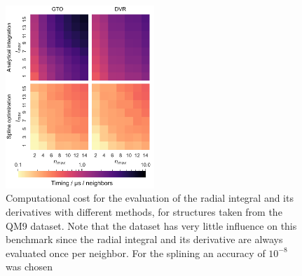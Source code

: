 \begin{figure}
    \centering
    \includegraphics[width=0.5\textwidth]{fig/radial-basis.pdf}
    \caption{Computational cost for the evaluation of the radial integral and its derivatives with different methods, for structures taken from the QM9 dataset. Note that the dataset has very little influence on this benchmark since the radial integral and its derivative are always evaluated once per neighbor. For the splining an accuracy of $10^{-8}$ was chosen}
    \label{fig:radial-basis}
\end{figure}

